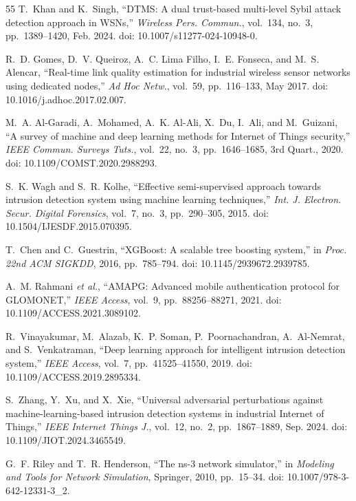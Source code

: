 \documentclass[conference]{IEEEtran}
\begin{document}
\begin{thebibliography}{55}
T.~Khan and K.~Singh, ``DTMS: A dual trust-based multi-level Sybil attack detection approach in WSNs,'' \textit{Wireless Pers. Commun.}, vol.~134, no.~3, pp.~1389--1420, Feb. 2024. doi: 10.1007/s11277-024-10948-0.

R.~D. Gomes, D.~V. Queiroz, A.~C. Lima Filho, I.~E. Fonseca, and M.~S. Alencar, ``Real-time link quality estimation for industrial wireless sensor networks using dedicated nodes,'' \textit{Ad Hoc Netw.}, vol.~59, pp.~116--133, May 2017. doi: 10.1016/j.adhoc.2017.02.007.

M.~A. Al-Garadi, A.~Mohamed, A.~K. Al-Ali, X.~Du, I.~Ali, and M.~Guizani, ``A survey of machine and deep learning methods for Internet of Things security,'' \textit{IEEE Commun. Surveys Tuts.}, vol.~22, no.~3, pp.~1646--1685, 3rd Quart., 2020. doi: 10.1109/COMST.2020.2988293.

S.~K. Wagh and S.~R. Kolhe, ``Effective semi-supervised approach towards intrusion detection system using machine learning techniques,'' \textit{Int. J. Electron. Secur. Digital Forensics}, vol.~7, no.~3, pp.~290--305, 2015. doi: 10.1504/IJESDF.2015.070395.

T.~Chen and C.~Guestrin, ``XGBoost: A scalable tree boosting system,'' in \textit{Proc. 22nd ACM SIGKDD}, 2016, pp.~785--794. doi: 10.1145/2939672.2939785.

A.~M. Rahmani \textit{et al.}, ``AMAPG: Advanced mobile authentication protocol for GLOMONET,'' \textit{IEEE Access}, vol.~9, pp.~88256--88271, 2021. doi: 10.1109/ACCESS.2021.3089102.

R.~Vinayakumar, M.~Alazab, K.~P. Soman, P.~Poornachandran, A.~Al-Nemrat, and S.~Venkatraman, ``Deep learning approach for intelligent intrusion detection system,'' \textit{IEEE Access}, vol.~7, pp.~41525--41550, 2019. doi: 10.1109/ACCESS.2019.2895334.

S.~Zhang, Y.~Xu, and X.~Xie, ``Universal adversarial perturbations against machine-learning-based intrusion detection systems in industrial Internet of Things,'' \textit{IEEE Internet Things J.}, vol.~12, no.~2, pp.~1867--1889, Sep. 2024. doi: 10.1109/JIOT.2024.3465549.

G.~F. Riley and T.~R. Henderson, ``The ns-3 network simulator,'' in \textit{Modeling and Tools for Network Simulation}, Springer, 2010, pp.~15--34. doi: 10.1007/978-3-642-12331-3\_2.


\end{thebibliography}
\end{document}
